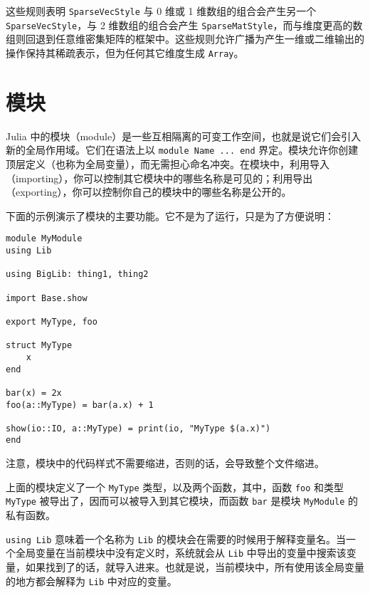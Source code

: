 这些规则表明 \texttt{SparseVecStyle} 与 0 维或 1 维数组的组合会产生另一个 \texttt{SparseVecStyle}，与 2 维数组的组合会产生 \texttt{SparseMatStyle}，而与维度更高的数组则回退到任意维密集矩阵的框架中。这些规则允许广播为产生一维或二维输出的操作保持其稀疏表示，但为任何其它维度生成 \texttt{Array}。



\hypertarget{10438697863683890874}{}


\chapter{模块}



Julia 中的模块（module）是一些互相隔离的可变工作空间，也就是说它们会引入新的全局作用域。它们在语法上以 \texttt{module Name ... end} 界定。模块允许你创建顶层定义（也称为全局变量），而无需担心命名冲突。在模块中，利用导入（importing），你可以控制其它模块中的哪些名称是可见的；利用导出（exporting），你可以控制你自己的模块中的哪些名称是公开的。



下面的示例演示了模块的主要功能。它不是为了运行，只是为了方便说明：




\begin{verbatim}
module MyModule
using Lib

using BigLib: thing1, thing2

import Base.show

export MyType, foo

struct MyType
    x
end

bar(x) = 2x
foo(a::MyType) = bar(a.x) + 1

show(io::IO, a::MyType) = print(io, "MyType $(a.x)")
end
\end{verbatim}



注意，模块中的代码样式不需要缩进，否则的话，会导致整个文件缩进。



上面的模块定义了一个 \texttt{MyType} 类型，以及两个函数，其中，函数 \texttt{foo} 和类型 \texttt{MyType} 被导出了，因而可以被导入到其它模块，而函数 \texttt{bar} 是模块 \texttt{MyModule} 的私有函数。



\texttt{using Lib} 意味着一个名称为 \texttt{Lib} 的模块会在需要的时候用于解释变量名。当一个全局变量在当前模块中没有定义时，系统就会从 \texttt{Lib} 中导出的变量中搜索该变量，如果找到了的话，就导入进来。也就是说，当前模块中，所有使用该全局变量的地方都会解释为 \texttt{Lib} 中对应的变量。



